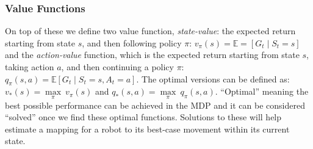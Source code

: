   \subsubsection{Value Functions}
    On top of these we define two value function, \emph{state-value}: the expected return starting from state $s$, and then following policy $\pi$: \( v_\pi \left(s\right) = \mathbb{E} = \left[G_t \mid S_t = s\right]\) and the \emph{action-value} function, which is the expected return starting from state $s$, taking action $a$, and then continuing a policy $\pi$: \( q_\pi \left(s, a\right) = \mathbb{E} \left[ G_t \mid S_t = s, A_t = a\right]\). The optimal versions can be defined as:\( v_* \left(s\right) = \underset{\pi}{\max} \ v_\pi \left(s\right)\) and \(q_* \left(s, a\right) = \underset{\pi}{\max} \ q_\pi \left(s, a\right)\). ``Optimal'' meaning the best possible performance can be achieved in the MDP and it can be considered ``solved'' once we find these optimal functions. Solutions to these will help estimate a mapping for a robot to its best-case movement within its current state.


    
